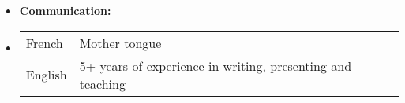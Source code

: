 \documentclass[letterpaper,11pt]{article}
\begin{document}
\begin{itemize}[label={},leftmargin=3mm]
\vspace{-0.4cm}

\item \large \textbf{Communication:} \normalsize
\vspace{0.1cm}

\item

\begin{tabular}{p{4cm}p{12.5cm}}
  French & Mother tongue \\[5pt]
  English & 5+ years of experience in writing, presenting and teaching \\[5pt]
\end{tabular}

\vspace{-0.5cm}

\end{itemize}

\vspace{-0.2cm}

\end{document}
